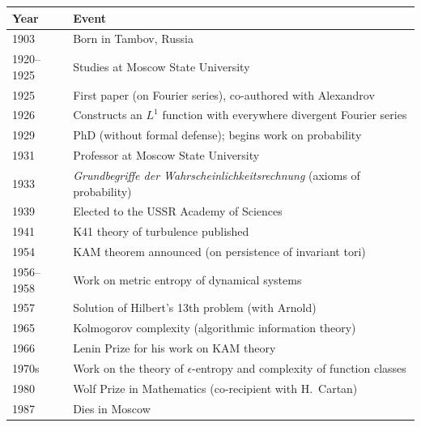 \begin{tabularx}{\linewidth}{|p{1.5cm}|>{\raggedright\arraybackslash}X|}
\hline
\textbf{Year} & \textbf{Event} \\ \hline
1903 & Born in Tambov, Russia \\ \hline
1920--1925 & Studies at Moscow State University \\ \hline
1925 & First paper (on Fourier series), co-authored with Alexandrov \\ \hline
1926 & Constructs an $L^1$ function with everywhere divergent Fourier series \\ \hline
1929 & PhD (without formal defense); begins work on probability \\ \hline
1931 & Professor at Moscow State University \\ \hline
1933 & \textit{Grundbegriffe der Wahrscheinlichkeitsrechnung} (axioms of probability) \\ \hline
1939 & Elected to the USSR Academy of Sciences \\ \hline
1941 & K41 theory of turbulence published \\ \hline
1954 & KAM theorem announced (on persistence of invariant tori) \\ \hline
1956--1958 & Work on metric entropy of dynamical systems \\ \hline
1957 & Solution of Hilbert's 13th problem (with Arnold) \\ \hline
1965 & Kolmogorov complexity (algorithmic information theory) \\ \hline
1966 & Lenin Prize for his work on KAM theory \\ \hline
1970s & Work on the theory of $\epsilon$-entropy and complexity of function classes \\ \hline
1980 & Wolf Prize in Mathematics (co-recipient with H.\ Cartan) \\ \hline
1987 & Dies in Moscow \\ \hline
\end{tabularx}
